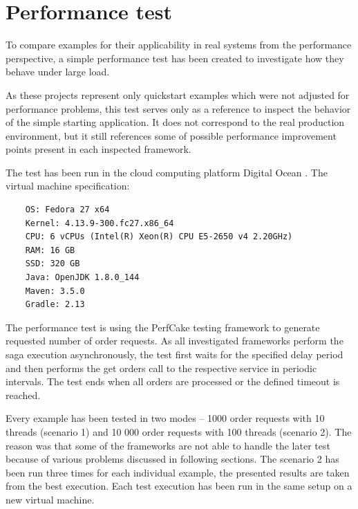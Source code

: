 \documentclass[oneside,
  digital, %
  table,   %
  lof,     %
  lot,     %
]{fithesis3}
\begin{document}
\section{Performance test}
\label{sec:perftest}

To compare examples for their applicability in real systems from the performance perspective, a simple performance test has been created to investigate how they behave under large load.

As these projects represent only quickstart examples which were not adjusted for performance problems, this test serves only as a reference to inspect the behavior of the simple starting application. It does not correspond to the real production environment, but it still references some of possible performance improvement points present in each inspected framework.

The test has been run in the cloud computing platform Digital Ocean \cite{digital-ocean}. The virtual machine specification:

\begin{verbatim}
    OS: Fedora 27 x64
    Kernel: 4.13.9-300.fc27.x86_64
    CPU: 6 vCPUs (Intel(R) Xeon(R) CPU E5-2650 v4 2.20GHz)
    RAM: 16 GB
    SSD: 320 GB
    Java: OpenJDK 1.8.0_144
    Maven: 3.5.0
    Gradle: 2.13
\end{verbatim}

The performance test is using the PerfCake \cite{perfcake} testing framework to generate requested number of order requests. As all investigated frameworks perform the saga execution asynchronously, the test first waits for the specified delay period and then performs the get orders call to the respective service in periodic intervals. The test ends when all orders are processed or the defined timeout is reached.

Every example has been tested in two modes -- 1000 order requests with 10 threads (scenario 1) and 10 000 order requests with 100 threads (scenario 2). The reason was that some of the frameworks are not able to handle the later test because of various problems discussed in following sections. The scenario 2 has been run three times for each individual example, the presented results are taken from the best execution. Each test execution has been run in the same setup on a new virtual machine.
\end{document}
